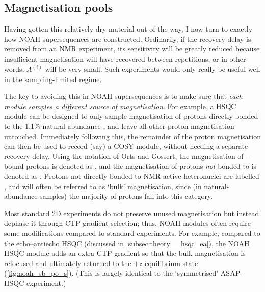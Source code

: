 \subsection{Magnetisation pools}
\label{subsec:noah__magpools}

Having gotten this relatively dry material out of the way, I now turn to exactly how NOAH supersequences are constructed.
Ordinarily, if the recovery delay is removed from an NMR experiment, its sensitivity will be greatly reduced because insufficient magnetisation will have recovered between repetitions; or in other words, $A^{(i)}$ will be very small.
Such experiments would only really be useful well in the sampling-limited regime.

The key to avoiding this in NOAH supersequences is to make sure that \textit{each module samples a different source of magnetisation}.
For example, a HSQC module can be designed to only sample magnetisation of protons directly bonded to the 1.1\%-natural abundance \carbon{}, and leave all other proton magnetisation untouched.
Immediately following this, the remainder of the proton magnetisation can then be used to record (say) a COSY module, without needing a separate recovery delay.
Using the notation of Orts and Gossert\autocite{Orts2018M}, the magnetisation of \carbon{}--bound protons is denoted as , and the magnetisation of protons \textit{not} bonded to \carbon{} is denoted as .
Protons not directly bonded to NMR-active heteronuclei are labelled , and will often be referred to as `bulk' magnetisation, since (in natural-abundance samples) the majority of protons fall into this category.

Most standard 2D experiments do not preserve unused magnetisation but instead dephase it through CTP gradient selection; thus, NOAH modules often require some modifications compared to standard experiments.
For example, compared to the echo--antiecho HSQC (discussed in \cref{subsec:theory__hsqc_ea}), the NOAH HSQC module\autocite{Kupce2017ACIE} adds an extra CTP gradient so that the bulk magnetisation is refocused and ultimately returned to the $+z$ equilibrium state (\cref{fig:noah_sb_po_s}).
(This is largely identical to the `symmetrised' ASAP-HSQC experiment\autocite{SchulzeSunninghausen2017JMR}.)

